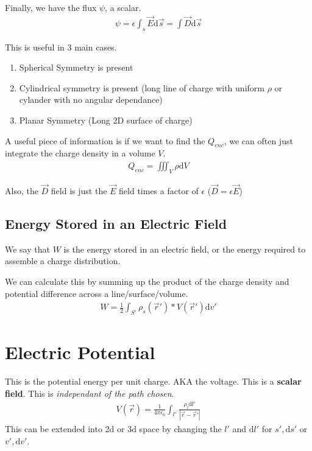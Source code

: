 \documentclass[12pt,letterpaper]{article} \usepackage{amsmath} \usepackage{graphicx} \usepackage[margin=1in]{geometry} \usepackage{longtable}  \usepackage{amssymb}
\begin{document}
	Finally, we have the flux $\psi$, a scalar. 
	\begin{align*}
		\psi = \epsilon \int_s \vec E \mathrm d \vec s = \int \vec D \mathrm d \vec s
	\end{align*}

	This is useful in 3 main cases. 
	\begin{enumerate}[]
		\item Spherical Symmetry is present
		\item Cylindrical symmetry is present (long line of charge with uniform $\rho$ or cylander with no angular dependance)
		\item Planar Symmetry (Long 2D surface of charge)
	\end{enumerate}

	A useful piece of information is if we want to find the $Q_{enc}$, we can often just integrate the charge density in a volume $V$.
	\begin{align*}
		Q_{enc} = \iiint_V \rho \mathrm d V
	\end{align*}

	Also, the $\vec D$ field is just the $\vec E$ field times a factor of $\epsilon$ ($\vec D = \epsilon \vec E$) 
	
	\subsection{Energy Stored in an Electric Field}
	We say that $W$ is the energy stored in an electric field, or the energy required to assemble a charge distribution. 
	
	We can calculate this by summing up the product of the charge density and potential difference across a line/surface/volume.
	\begin{align*}
		W = \frac{1}{2}\int_{S\prime}\rho_s(\vec r\prime)*V(\vec r\prime) \mathrm d v\prime
	\end{align*}
	
	\section{Electric Potential}
	This is the potential energy per unit charge. AKA the voltage. This is a \textbf{scalar field}. This is \textit{independant of the path chosen}. 
	\begin{align*}
		V(\vec r) = \frac{1}{4\pi \epsilon _0} \int_{l\prime }\frac{\rho _l \mathrm d l\prime}{|\vec r-\vec r\prime| }
	\end{align*}
	This can be extended into 2d or 3d space by changing the $l\prime$ and $\mathrm d l\prime$ for $s\prime, \mathrm d s\prime$ or $v\prime, \mathrm d v\prime$.
	
\end{document}
